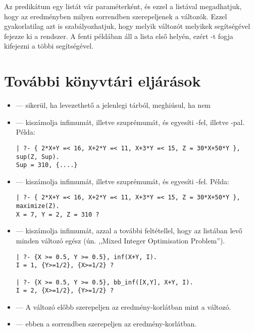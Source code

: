 Az  predikátum egy listát vár paraméterként, és ezzel a
listával megadhatjuk, hogy az eredményben milyen sorrendben szerepeljenek
a változók. Ezzel gyakorlatilag azt is szabályozhatjuk, hogy melyik változót
melyikek segítségével fejezze ki a rendszer. A fenti példában  áll a
lista első helyén, ezért -t fogja kifejezni a többi segítségével.

\section{További könyvtári eljárások}

\begin{itemize}
\item {} --- sikerül, ha  levezethető a
jelenlegi tárból, meghiúsul, ha nem

\item {} --- kiszámolja  infimumát,
illetve szuprémumát, és egyesíti -fel, illetve -pal.
Példa:

\begin{verbatim}
| ?- { 2*X+Y =< 16, X+2*Y =< 11, X+3*Y =< 15, Z = 30*X+50*Y }, sup(Z, Sup).
Sup = 310, {....}
\end{verbatim}

\item {} --- kiszámolja  infimumát,
illetve szuprémumát, és egyesíti -fel. Példa:

\begin{verbatim}
| ?- { 2*X+Y =< 16, X+2*Y =< 11, X+3*Y =< 15, Z = 30*X+50*Y }, maximize(Z).
X = 7, Y = 2, Z = 310 ?
\end{verbatim}

\item {} --- kiszámolja  infimumát,
azzal a további feltétellel, hogy az  listában levő minden
változó egész (ún. ,,Mixed Integer Optimisation Problem'').

\begin{verbatim}
| ?- {X >= 0.5, Y >= 0.5}, inf(X+Y, I).
I = 1, {Y>=1/2}, {X>=1/2} ?

| ?- {X >= 0.5, Y >= 0.5}, bb_inf([X,Y], X+Y, I).
I = 2, {X>=1/2}, {Y>=1/2} ?
\end{verbatim}

\item {} --- A  változó előbb szerepeljen az
eredmény-korlátban mint a  változó.

\item {} ---  ebben a sorrendben
szerepeljen az eredmény-korlátban.

\end{itemize}

